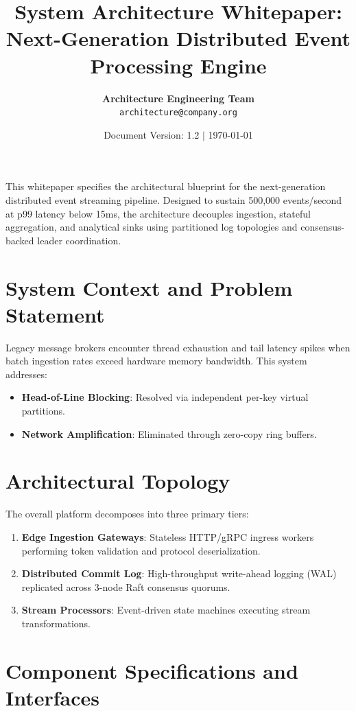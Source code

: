 \documentclass[11pt,a4paper]{article}
\title{\LARGE\textbf{\textcolor{primary}{System Architecture Whitepaper:}}\\[0.3em] \Large Next-Generation Distributed Event Processing Engine}
\author{
  \textbf{Architecture Engineering Team} \\
  \texttt{architecture@company.org}
}
\date{Document Version: 1.2 \quad $|$ \quad \today}
\begin{document}
\maketitle

\begin{callout}
This whitepaper specifies the architectural blueprint for the next-generation distributed event streaming pipeline. Designed to sustain 500,000 events/second at p99 latency below 15ms, the architecture decouples ingestion, stateful aggregation, and analytical sinks using partitioned log topologies and consensus-backed leader coordination.
\end{callout}

\section{System Context and Problem Statement}
Legacy message brokers encounter thread exhaustion and tail latency spikes when batch ingestion rates exceed hardware memory bandwidth. This system addresses:
\begin{itemize}
    \item \textbf{Head-of-Line Blocking}: Resolved via independent per-key virtual partitions.
    \item \textbf{Network Amplification}: Eliminated through zero-copy ring buffers.
\end{itemize}

\section{Architectural Topology}
The overall platform decomposes into three primary tiers:

\begin{enumerate}
    \item \textbf{Edge Ingestion Gateways}: Stateless HTTP/gRPC ingress workers performing token validation and protocol deserialization.
    \item \textbf{Distributed Commit Log}: High-throughput write-ahead logging (WAL) replicated across 3-node Raft consensus quorums.
    \item \textbf{Stream Processors}: Event-driven state machines executing stream transformations.
\end{enumerate}

\section{Component Specifications and Interfaces}
\end{document}
